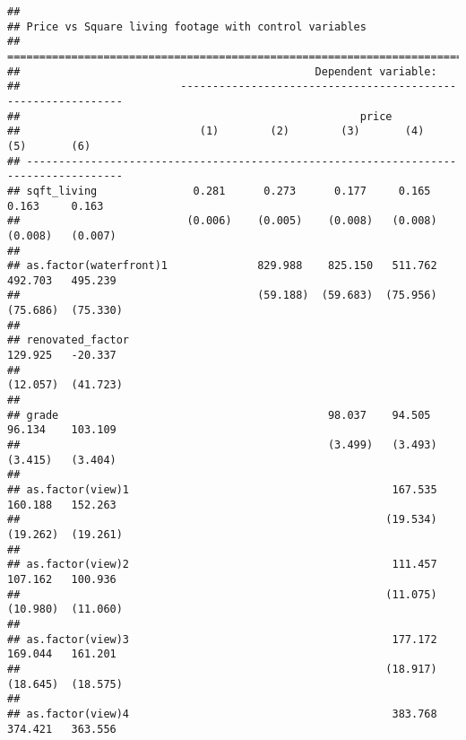 \documentclass[
]{article}
\begin{document}
\begin{verbatim}
## 
## Price vs Square living footage with control variables
## =====================================================================================
##                                              Dependent variable:                     
##                         -------------------------------------------------------------
##                                                     price                            
##                            (1)        (2)        (3)       (4)       (5)       (6)   
## -------------------------------------------------------------------------------------
## sqft_living               0.281      0.273      0.177     0.165     0.163     0.163  
##                          (0.006)    (0.005)    (0.008)   (0.008)   (0.008)   (0.007) 
##                                                                                      
## as.factor(waterfront)1              829.988    825.150   511.762   492.703   495.239 
##                                     (59.188)  (59.683)  (75.956)  (75.686)  (75.330) 
##                                                                                      
## renovated_factor                                                   129.925   -20.337 
##                                                                   (12.057)  (41.723) 
##                                                                                      
## grade                                          98.037    94.505    96.134    103.109 
##                                                (3.499)   (3.493)   (3.415)   (3.404) 
##                                                                                      
## as.factor(view)1                                         167.535   160.188   152.263 
##                                                         (19.534)  (19.262)  (19.261) 
##                                                                                      
## as.factor(view)2                                         111.457   107.162   100.936 
##                                                         (11.075)  (10.980)  (11.060) 
##                                                                                      
## as.factor(view)3                                         177.172   169.044   161.201 
##                                                         (18.917)  (18.645)  (18.575) 
##                                                                                      
## as.factor(view)4                                         383.768   374.421   363.556 

\end{verbatim}
\end{document}
